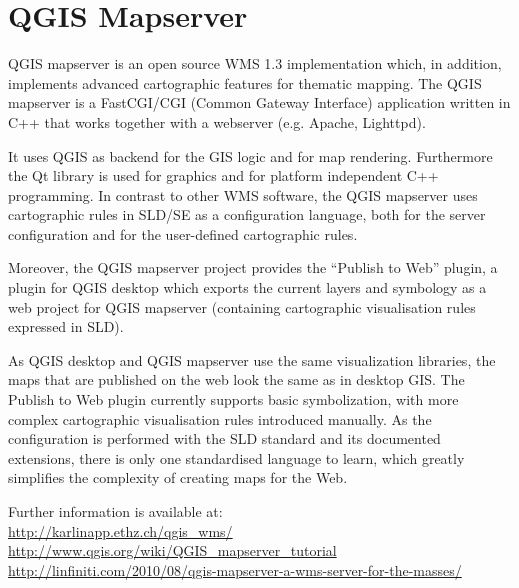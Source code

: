 
\chapter{QGIS Mapserver}\label{label_qgismapserver}

\updatedisclaimer

QGIS mapserver is an open source WMS 1.3 implementation which, in addition,
implements advanced cartographic features for thematic mapping. The QGIS
mapserver is a FastCGI/CGI (Common Gateway Interface) application written in
C++ that works together with a webserver (e.g. Apache, Lighttpd). 


It uses QGIS as backend for the GIS logic and for map rendering. Furthermore the 
Qt library is used for graphics and for platform independent 
C++ programming. In contrast to other WMS software, the QGIS mapserver uses 
cartographic rules in SLD/SE as a configuration language, both for the server 
configuration and for the user-defined cartographic rules. 

Moreover, the QGIS mapserver project provides the “Publish to Web” plugin, a 
plugin for QGIS desktop which exports the current layers and symbology as a 
web project for QGIS mapserver (containing cartographic visualisation rules 
expressed in SLD).

As QGIS desktop and QGIS mapserver use the same visualization libraries, the
maps that are published on the web look the same as in desktop GIS. The 
Publish to Web plugin currently supports basic symbolization, with more complex 
cartographic visualisation rules introduced manually. As the configuration is 
performed with the SLD standard and its documented extensions, there is only 
one standardised language to learn, which greatly simplifies the complexity 
of creating maps for the Web.

Further information is available at: \\
\url{http://karlinapp.ethz.ch/qgis\_wms/} \\
\url{http://www.qgis.org/wiki/QGIS\_mapserver\_tutorial} \\
\url{http://linfiniti.com/2010/08/qgis-mapserver-a-wms-server-for-the-masses/}


\FloatBarrier
